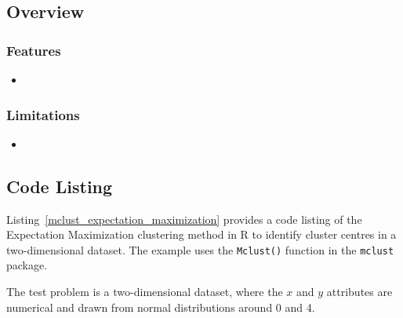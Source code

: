 \subsection{Overview}

\subsubsection{Features}

\begin{itemize}
	\item 
\end{itemize}

\subsubsection{Limitations}

\begin{itemize}
	\item 
\end{itemize}


\subsection{Code Listing}
Listing~\ref{mclust_expectation_maximization} provides a code listing of the Expectation Maximization clustering method in R to identify cluster centres in a two-dimensional dataset.
The example uses the \texttt{Mclust()} function in the \texttt{mclust}  package.

The test problem is a two-dimensional dataset, where the $x$ and $y$ attributes are numerical and drawn from normal distributions around 0 and 4. 





